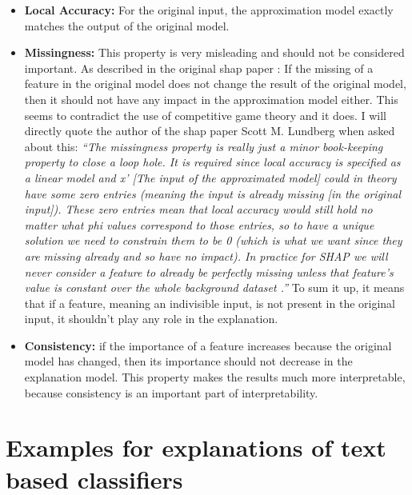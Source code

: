 \begin{itemize}
    \item \textbf{Local Accuracy: } For the original input, the approximation model exactly matches the output of the original model.
    \item \textbf{Missingness: } This property is very misleading and should not be considered important. As described in the original shap paper \cite{shapPaper}: If the missing of a feature in  the original model does not change the result of the original model, then it should not have any impact in the approximation model either. This seems to contradict the use of competitive game theory and it does. I will directly quote the author of the shap paper Scott M. Lundberg when asked about this: \vspace{0.5cm}\newline
    \textit{\enquote{The missingness property is really just a minor book-keeping property to close a loop hole. It is required since local accuracy is specified as a linear model and x' [The input of the approximated model] could in theory have some zero entries (meaning the input is already missing [in the original input]). These zero entries mean that local accuracy would still hold no matter what phi values correspond to those entries, so to have a unique solution we need to constrain them to be 0 (which is what we want since they are missing already and so have no impact). In practice for SHAP we will never consider a feature to already be perfectly missing unless that feature's value is constant over the whole background dataset \cite{slundbergMissingness}.}} \newline
    \vspace{0.5cm} \newline
    To sum it up, it means that if a feature, meaning an indivisible input, is not present in the original input, it shouldn't play any role in the explanation.
    \vspace{0.5cm} \newline
    \item \textbf{Consistency:} if the importance of a feature increases because the original model has changed, then its importance should not decrease in the explanation model. This property makes the results much more interpretable, because consistency is an important part of interpretability.
\end{itemize}

\section{Examples for explanations of text based classifiers}

